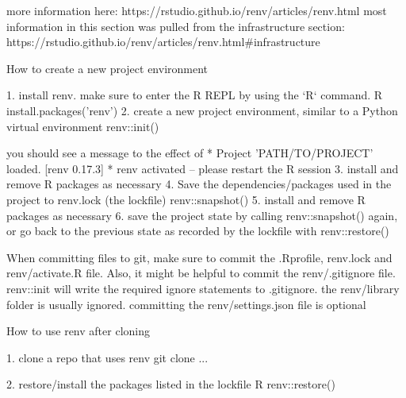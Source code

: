 more information here: https://rstudio.github.io/renv/articles/renv.html
most information in this section was pulled from the infrastructure section: https://rstudio.github.io/renv/articles/renv.html#infrastructure

How to create a new project environment

1. install renv. make sure to enter the R REPL by using the `R` command.
    R
    install.packages('renv')
2. create a new project environment, similar to a Python virtual environment
    renv::init()
	
	you should see a message to the effect of
	* Project 'PATH/TO/PROJECT' loaded. [renv 0.17.3]
	* renv activated -- please restart the R session
3. install and remove R packages as necessary
4. Save the dependencies/packages used in the project to renv.lock (the lockfile)
    renv::snapshot()
5. install and remove R packages as necessary
6. save the project state by calling renv::snapshot() again, or go back to the previous state as recorded
   by the lockfile with renv::restore()

When committing files to git, make sure to commit the .Rprofile, renv.lock and renv/activate.R file.
Also, it might be helpful to commit the renv/.gitignore file. renv::init will write the required ignore statements to .gitignore.
the renv/library folder is usually ignored.
committing the renv/settings.json file is optional

How to use renv after cloning

1. clone a repo that uses renv
	git clone ...

2. restore/install the packages listed in the lockfile
	R
	renv::restore()

